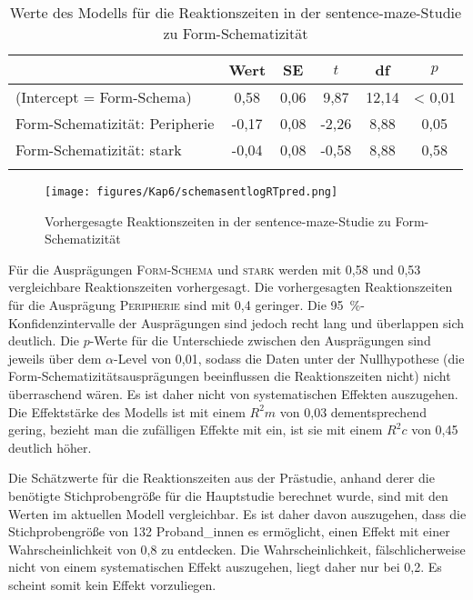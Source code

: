 \begin{table}[H]
\begin{tabular}{l S[table-format=-1.2] S[table-format=1.2] S[table-format=-1.2] S[table-format=2.2] S[table-format=<1.2]}
\lsptoprule
& {Wert} & {SE} & {$t$} & {df} & {$p$} \\\midrule
(Intercept = Form-Schema) & 0,58 & 0,06 & 9,87 & 12,14 & < 0,01 \\ 
Form-Schematizität: Peripherie & -0,17 & 0,08 & -2,26 & 8,88 & 0,05 \\ 
Form-Schematizität: stark & -0,04 & 0,08 & -0,58 & 8,88 & 0,58 \\ 
\lspbottomrule
\end{tabular}
\caption{Werte des Modells für die Reaktionszeiten in der sentence-maze-Studie zu Form-Schematizität}
\label{sentmazeschemamodell}
\end{table}
\vfill
\begin{figure}[H]
\texttt{[image: figures/Kap6/schemasentlogRTpred.png]} 
\caption{Vorhergesagte Reaktionszeiten in der sentence-maze-Studie zu Form-Schematizität}
\label{schemasentlogRTpred}
\end{figure}
\pagebreak

Für die Ausprägungen \textsc{Form-Schema} und \textsc{stark} werden mit 0,58 und 0,53 vergleichbare Reaktionszeiten vorhergesagt. Die vorhergesagten Reaktionszeiten für die Ausprägung \textsc{Peripherie} sind mit 0,4 geringer. Die 95~\%-Konfidenzin\-ter\-val\-le der Ausprägungen sind jedoch recht lang und überlappen sich deutlich. Die $p$-Werte für die Unterschiede zwischen den Ausprägungen sind jeweils über dem $\alpha$-Level von 0,01, sodass die Daten unter der Nullhypothese (die Form-Sche\-ma\-ti\-zi\-täts\-aus\-prä\-gun\-gen beeinflussen die Reaktionszeiten nicht) nicht überraschend wären. Es ist daher nicht von systematischen Effekten auszugehen.  Die Effektstärke des Modells ist mit einem $R^2m$ von 0,03 dementsprechend gering, bezieht man die zufälligen Effekte mit ein, ist sie mit einem $R^2c$ von 0,45 deutlich höher.



Die Schätzwerte für die Reaktionszeiten aus der Prästudie, anhand derer die benötigte Stichprobengröße für die Hauptstudie berechnet wurde, sind mit den Werten im aktuellen Modell vergleichbar. Es ist daher davon auszugehen, dass die Stichprobengröße von 132 Proband\_innen es ermöglicht, einen Effekt mit einer Wahrscheinlichkeit von 0,8 zu entdecken. Die Wahrscheinlichkeit, fälschlicherweise nicht von einem systematischen Effekt auszugehen, liegt daher nur bei 0,2. Es scheint somit kein Effekt vorzuliegen.

